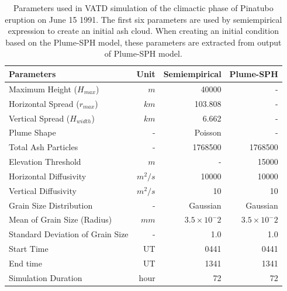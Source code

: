 \documentclass[utf8]{frontiersSCNS} %
\begin{document}
\begin{table}[htp]
\centering
\caption{Parameters used in VATD simulation of the climactic phase of Pinatubo eruption on June 15 1991. The first six parameters are used by semiempirical expression to create an initial ash cloud. When creating an initial condition based on the Plume-SPH model, these parameters are extracted from output of Plume-SPH model.}
	 \begin{tabular}{lrrr}
	 \hline
	 Parameters & Unit & Semiempirical & Plume-SPH \\
	 \hline
	 Maximum Height ($H_{max}$) & $m$ & 40000 & - \\ %
	 Horizontal Spread ($r_{max}$) & $km$ & 103.808 & -\\
	 Vertical Spread ($H_{width}$) & $km$ & 6.662 & - \\
	 Plume Shape & - & Poisson & - \\
	 Total Ash Particles & - & 1768500 & 1768500 \\
	 Elevation Threshold & $m$ & - & 15000 \\
	 Horizontal Diffusivity & $m^2/s$ &10000 & 10000\\
	 Vertical Diffusivity & $m^2/s$ & 10 & 10 \\
	 Grain Size Distribution & - & Gaussian & Gaussian \\
	 Mean of Grain Size (Radius) & $mm$ & $3.5 \times 10 ^-2$ & $3.5 \times 10 ^-2$ \\
	 Standard Deviation of Grain Size & - & 1.0 & 1.0 \\
	 	Start Time & UT & 0441 & 0441 \\
	 End time & UT & 1341 & 1341 \\
	 Simulation Duration & hour & 72 & 72 \\
	 \hline
	 \end{tabular}
	 \label{tab:input_parameter_Puff_simulation}
\end{table}
\end{document}
